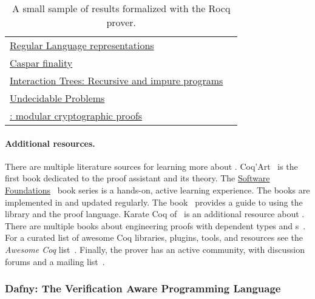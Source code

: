 \begin{table}[p]
\begin{NiceTabularX}{\textwidth}{@{}l@{ }X@{}}
   \href{https://github.com/rocq-community/reglang}%
   {Regular Language representations}
   & \textcite{doczkal2018}
   \\
   \href{https://github.com/runtimeverification/casper-proofs/tree/master}
   {Caspar  finality}
   & \textcite{palmskog2018}
   \\
   \href{https://github.com/DeepSpec/InteractionTrees}%
   {Interaction Trees: Recursive and impure programs}
   & \textcite{xia2019}
   \\
   \href{https://github.com/uds-psl/coq-library-undecidability}%
   {Undecidable Problems}
   & \textcite{forster2020b}
   \\
   \href{https://github.com/SSProve/ssprove}%
   {: modular cryptographic proofs}
   & \textcite{haselwarter2023}
   \\
   \bottomrule
\end{NiceTabularX}
\caption[The Rocq prover formalization results]
{A small sample of results formalized with the Rocq prover.}
\label{tab:rocq-results}
\end{table}

\paragraph*{Additional resources.}
There are multiple literature sources for learning more about .
Coq'Art~\cite{bertot2004} is the first book dedicated to the proof assistant and
its theory. The \href{https://softwarefoundations.cis.upenn.edu}{Software
Foundations}~\cite{cpierce20221} book series is a hands-on, active learning
experience. The books are implemented in  and updated regularly. The
 book~\cite{mahboubi2022} provides a guide to using
the library and the  proof language. Karate Coq
of~\textcite{affeldt2023} is an additional resource about . There are multiple books about engineering  proofs with
dependent types and s~\cite{chlipala2022,chlipala2013,sergey2014,smolka2021}. For a curated
list of awesome Coq libraries, plugins, tools, and resources see the
\emph{Awesome Coq} list~\cite{awesome-coq}. Finally, the  prover has
an active community, with discussion forums and a mailing
list~\cite{rocq-community}.

\subsubsection{Dafny: The Verification Aware Programming Language}
\label{subsubsec:dafny}

